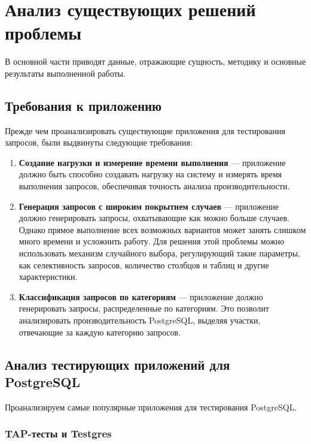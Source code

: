 \chapter{Анализ существующих решений проблемы}

В основной части приводят данные, отражающие сущность, методику и основные результаты выполненной работы.

\section{Требования к приложению}

Прежде чем проанализировать существующие приложения для тестирования запросов, были выдвинуты следующие требования:
\begin{enumerate}
	\item \textbf{Создание нагрузки и измерение времени выполнения} — приложение должно быть способно создавать нагрузку на систему и измерять время выполнения запросов, обеспечивая точность анализа производительности.
	\item \textbf{Генерация запросов с широким покрытием случаев} — приложение должно генерировать запросы, охватывающие как можно больше случаев. Однако прямое выполнение всех возможных вариантов может занять слишком много времени и усложнить работу. Для решения этой проблемы можно использовать механизм случайного выбора, регулирующий такие параметры, как селективность запросов, количество столбцов и таблиц и другие характеристики.
	\item \textbf{Классификация запросов по категориям} — приложение должно генерировать запросы, распределенные по категориям. Это позволит анализировать производительность PostgreSQL, выделяя участки, отвечающие за каждую категорию запросов.
\end{enumerate}

\section{Анализ тестирующих приложений для PostgreSQL}

Проанализируем самые популярные приложения для тестирования PostgreSQL.

\subsection{TAP-тесты и Testgres}

